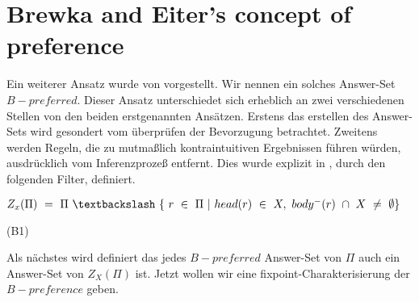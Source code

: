 \section{Brewka and Eiter's concept of preference}


Ein weiterer Ansatz wurde von \cite{BrewkaEiter1999} vorgestellt. Wir nennen ein solches Answer-Set $B-preferred$. Dieser Ansatz unterschiedet sich erheblich an zwei verschiedenen Stellen von den beiden erstgenannten Ansätzen. Erstens das erstellen des Answer-Sets wird gesondert vom überprüfen der Bevorzugung betrachtet.
Zweitens werden Regeln, die zu mutmaßlich kontraintuitiven Ergebnissen führen würden, ausdrücklich vom Inferenzprozeß entfernt. Dies wurde explizit in \cite{BrewkaEiter2000}, durch den folgenden Filter, definiert. \\

\begin{center}
	$Z_x(\Pi)~=~\Pi~\textbackslash~\{~r~\in~\Pi~|~head(r)~\in~X,~body^-(r)~\cap~X~\neq~\emptyset \}$\\
\end{center}
\begin{flushright}
  (B1)
\end{flushright}

Als nächstes wird definiert das jedes $B-preferred$ Answer-Set von $\Pi$ auch ein Answer-Set von $Z_X(\Pi)$ ist. Jetzt wollen wir eine fixpoint-Charakterisierung der $B-preference$ geben.\\

